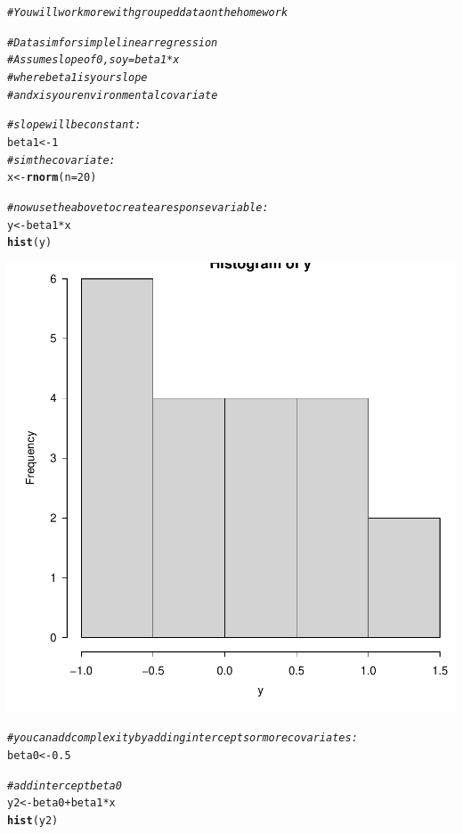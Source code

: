 \documentclass{article}\usepackage[]{graphicx}\usepackage[]{color}
\makeatletter
\newcommand{\hlnum}[1]{\textcolor[rgb]{0.686,0.059,0.569}{#1}}%
\newcommand{\hlcom}[1]{\textcolor[rgb]{0.678,0.584,0.686}{\textit{#1}}}%
\newcommand{\hlopt}[1]{\textcolor[rgb]{0,0,0}{#1}}%
\newcommand{\hlstd}[1]{\textcolor[rgb]{0.345,0.345,0.345}{#1}}%
\newcommand{\hlkwb}[1]{\textcolor[rgb]{0.69,0.353,0.396}{#1}}%
\newcommand{\hlkwc}[1]{\textcolor[rgb]{0.333,0.667,0.333}{#1}}%
\newcommand{\hlkwd}[1]{\textcolor[rgb]{0.737,0.353,0.396}{\textbf{#1}}}%
\newenvironment{kframe}{%
 \def\at@end@of@kframe{}%
 \ifinner\ifhmode%
  \def\at@end@of@kframe{\end{minipage}}%
  \begin{minipage}{\columnwidth}%
 \fi\fi%
 \def\FrameCommand##1{\hskip\@totalleftmargin \hskip-\fboxsep
 \colorbox{shadecolor}{##1}\hskip-\fboxsep
     \hskip-\linewidth \hskip-\@totalleftmargin \hskip\columnwidth}%
 \MakeFramed {\advance\hsize-\width
   \@totalleftmargin\z@ \linewidth\hsize
   \@setminipage}}%
 {\par\unskip\endMakeFramed%
 \at@end@of@kframe}
\newenvironment{knitrout}{}{} %
\makeatother
\begin{document}
\begin{knitrout}
{}


\begin{kframe}\begin{alltt}
\hlcom{# You will work more with grouped data on the homework}

\hlcom{# Data sim for simple linear regression}
\hlcom{# Assume slope of 0, so y = beta1*x}
\hlcom{# where beta1 is your slope}
\hlcom{# and x is your environmental covariate}

\hlcom{# slope will be constant:}
\hlstd{beta1} \hlkwb{<-} \hlnum{1}
\hlcom{# sim the covariate:}
\hlstd{x} \hlkwb{<-} \hlkwd{rnorm}\hlstd{(}\hlkwc{n} \hlstd{=} \hlnum{20}\hlstd{)}

\hlcom{# now use the above to create a response variable:}
\hlstd{y} \hlkwb{<-} \hlstd{beta1}\hlopt{*}\hlstd{x}
\hlkwd{hist}\hlstd{(y)}
\end{alltt}
\end{kframe}

{\centering \includegraphics[width=.6\linewidth]{figure/Tutorial08-datasims-S2022-Rnwauto-report-4} 

}


\begin{kframe}\begin{alltt}
\hlcom{# you can add complexity by adding intercepts or more covariates:}
\hlstd{beta0} \hlkwb{<-} \hlnum{0.5}

\hlcom{# add intercept beta0}
\hlstd{y2} \hlkwb{<-} \hlstd{beta0} \hlopt{+} \hlstd{beta1}\hlopt{*}\hlstd{x}
\hlkwd{hist}\hlstd{(y2)}
\end{alltt}
\end{kframe}


\end{knitrout}
\end{document}
